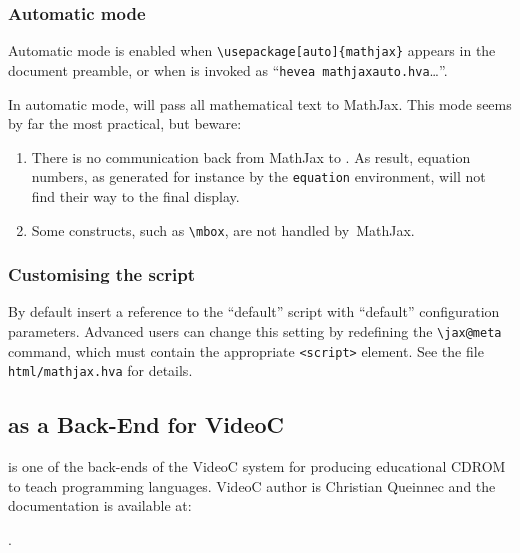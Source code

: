 \subsubsection{Automatic mode}
%
Automatic mode is enabled when \verb+\usepackage[auto]{mathjax}+
appears in the document preamble,
or when \hevea{} is invoked as ``\verb+hevea mathjaxauto.hva+\ldots''.

In automatic mode, \hevea{} will pass all mathematical text to \textsf{MathJax}.
This mode seems by far the most practical, but beware:
\begin{enumerate}
\item There is no communication back from \textsf{MathJax} to \hevea{}.
As result, equation numbers, as generated for instance by the
\texttt{equation} environment, will not find their way to the final display.
\item Some constructs, such as \verb+\mbox+, are not handled
by~\textsf{MathJax}.
\end{enumerate}

\subsubsection{Customising the  script}
By default \hevea{} insert a reference to the ``default''
 script
with ``default'' configuration parameters.
Advanced users can change this setting by redefining the \verb+\jax@meta+
command, which must contain the appropriate \verb+<script>+ element.
See the file \verb+html/mathjax.hva+ for details.

\iffalse
\begin{mathjax}
\begin{eqnarray*}
\textsf{Fib}(0) & = & 1\\
\textsf{Fib}(1) & = & 1\\
\textsf{Fib}(n+2) & = & \textsf{Fib}(n+1) + \textsf{Fib}(n) 
\end{eqnarray*}
\end{mathjax}
\fi

\iffalse
\subsection{\hevea{} as a Back-End for VideoC}
\hevea{} is one of the back-ends of the VideoC system for producing
educational CDROM to teach programming languages.
VideoC author is Christian Queinnec and the documentation is available
at:
\begin{center}
.
\end{center}


